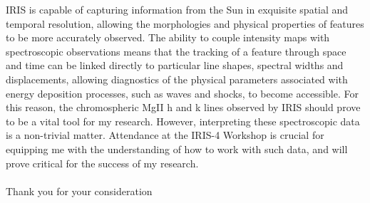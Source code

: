 \documentclass[10pt]{article}
\begin{document}
IRIS is capable of capturing information from the Sun in exquisite spatial and temporal resolution, allowing the morphologies and physical properties of features to be more accurately observed. The ability to couple intensity maps with spectroscopic observations means that the tracking of a feature through space and time can be linked directly to particular line shapes, spectral widths and displacements, allowing diagnostics of the physical parameters associated with energy deposition processes, such as waves and shocks, to become accessible. For this reason, the chromospheric MgII h and k lines observed by IRIS should prove to be a vital tool for my research. However, interpreting these spectroscopic data is a non-trivial matter. Attendance at the IRIS-4 Workshop is crucial for equipping me with the understanding of how to work with such data, and will prove critical for the success of my research.\\
\\

Thank you for your consideration



  
\end{document}
